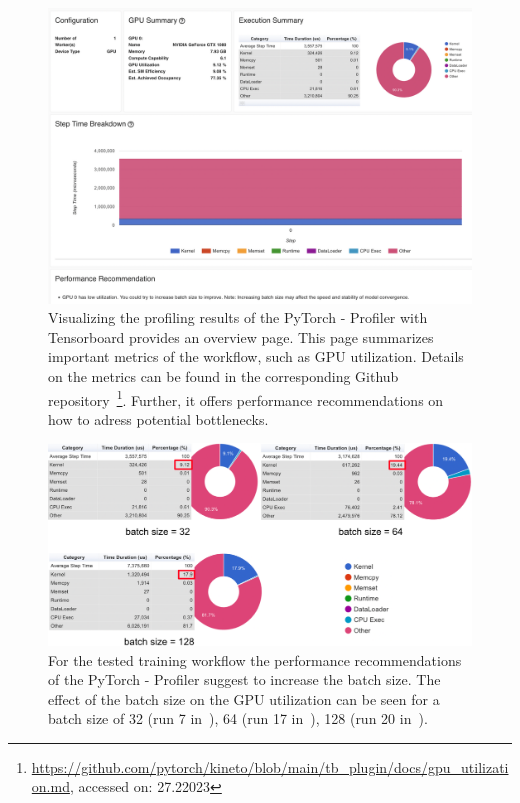 \documentclass[12pt, a4paper, hidelinks]{article}
\begin{document}
\begin{figure}[H]
\centering
\includegraphics[width=1\textwidth]{./assets/scap_gtx1080_profiler-torch_14650076}
\caption[PyTorch - Profiler: Overview]{Visualizing the profiling results of the PyTorch - Profiler with Tensorboard provides an overview page. This page summarizes important metrics of the workflow, such as \ac{GPU} utilization. Details on the metrics can be found in the corresponding Github repository~\footnote{\url{https://github.com/pytorch/kineto/blob/main/tb_plugin/docs/gpu_utilization.md}, accessed on: 27.22023}. Further, it offers performance recommendations on how to adress potential bottlenecks. }
\label{fig:scap_gtx1080_profiler-torch_14650076}
\end{figure}

\begin{figure}[H]
\centering
\includegraphics[width=1\textwidth]{./assets/scap_gtx1080_profiler-torch_comparison-batch-size}
\caption[PyTorch - Profiler: Performance Recommendation]{For the tested training workflow the performance recommendations of the PyTorch - Profiler suggest to increase the batch size. The effect of the batch size on the \ac{GPU} utilization can be seen for a batch size of 32 (run 7 in~), 64 (run 17 in~), 128 (run 20 in~).}
\label{fig:scap_gtx1080_profiler-torch_comparison-batch-size}
\end{figure}
\end{document}
